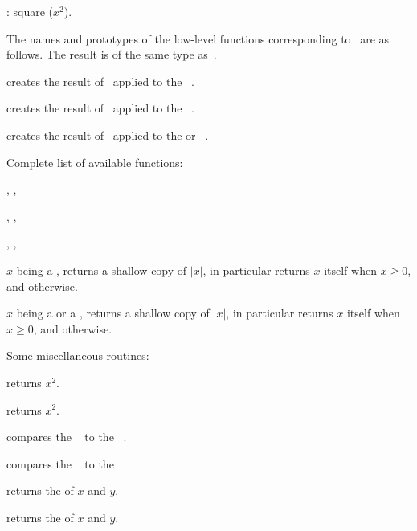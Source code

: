\item {}: square ($x^2$).

\noindent The names and prototypes of the low-level functions corresponding
to \op\ are as follows. The result is of the same type as~.

 creates the result of \op\ applied to the
~.

 creates the result of \op\ applied to the
~.

 creates the result of \op\ applied to the
 or ~.

\noindent Complete list of available functions:

, , 

, , 

, , 

 $x$ being a , returns a shallow copy of
$|x|$, in particular returns $x$ itself when $x \geq 0$, and 
otherwise.

 $x$ being a  or a , returns
a shallow copy of $|x|$, in particular returns $x$ itself when $x \geq 0$, and
 otherwise.


\noindent Some miscellaneous routines:

 returns $x^2$.

 returns $x^2$.


 compares the ~ to the
~.

 compares the ~ to the
~.



 returns the  of $x$ and $y$.




 returns the  of $x$ and $y$.

